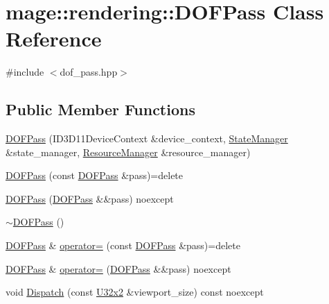 \hypertarget{classmage_1_1rendering_1_1_d_o_f_pass}{}\section{mage\+:\+:rendering\+:\+:D\+O\+F\+Pass Class Reference}
\label{classmage_1_1rendering_1_1_d_o_f_pass}


{\ttfamily \#include $<$dof\+\_\+pass.\+hpp$>$}

\subsection*{Public Member Functions}
\begin{DoxyCompactItemize}
\item 
\hyperlink{classmage_1_1rendering_1_1_d_o_f_pass_a5dcf32906eadc564a8ee6331bdee5def}{D\+O\+F\+Pass} (I\+D3\+D11\+Device\+Context \&device\+\_\+context, \hyperlink{classmage_1_1rendering_1_1_state_manager}{State\+Manager} \&state\+\_\+manager, \hyperlink{classmage_1_1rendering_1_1_resource_manager}{Resource\+Manager} \&resource\+\_\+manager)
\item 
\hyperlink{classmage_1_1rendering_1_1_d_o_f_pass_a74e732ae80162b1b041a1095d38eda67}{D\+O\+F\+Pass} (const \hyperlink{classmage_1_1rendering_1_1_d_o_f_pass}{D\+O\+F\+Pass} \&pass)=delete
\item 
\hyperlink{classmage_1_1rendering_1_1_d_o_f_pass_ab77789a6762c38e7e4ac389637652963}{D\+O\+F\+Pass} (\hyperlink{classmage_1_1rendering_1_1_d_o_f_pass}{D\+O\+F\+Pass} \&\&pass) noexcept
\item 
\hyperlink{classmage_1_1rendering_1_1_d_o_f_pass_a3009125880a1546657d2f57179299e3b}{$\sim$\+D\+O\+F\+Pass} ()
\item 
\hyperlink{classmage_1_1rendering_1_1_d_o_f_pass}{D\+O\+F\+Pass} \& \hyperlink{classmage_1_1rendering_1_1_d_o_f_pass_ac70bc446c50db4ab919220a344be8045}{operator=} (const \hyperlink{classmage_1_1rendering_1_1_d_o_f_pass}{D\+O\+F\+Pass} \&pass)=delete
\item 
\hyperlink{classmage_1_1rendering_1_1_d_o_f_pass}{D\+O\+F\+Pass} \& \hyperlink{classmage_1_1rendering_1_1_d_o_f_pass_a4155c31b1fe485edf5c7c3b635b737d0}{operator=} (\hyperlink{classmage_1_1rendering_1_1_d_o_f_pass}{D\+O\+F\+Pass} \&\&pass) noexcept
\item 
void \hyperlink{classmage_1_1rendering_1_1_d_o_f_pass_a60d839bbeb81e12778ef96468954951a}{Dispatch} (const \hyperlink{namespacemage_a88e05bff0300120c013285d3dcad95c5}{U32x2} \&viewport\+\_\+size) const noexcept
\end{DoxyCompactItemize}
